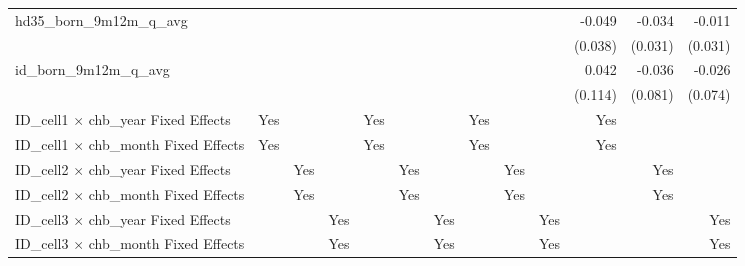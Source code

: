 \begin{tabular}{lrrrrrrrrrrrr}
hd35\_born\_9m12m\_q\_avg                   &              &              &              &              &              &              &              &              &              &       -0.049 &       -0.034 &       -0.011 \\ 
                                            &              &              &              &              &              &              &              &              &              &      (0.038) &      (0.031) &      (0.031) \\ 
id\_born\_9m12m\_q\_avg                     &              &              &              &              &              &              &              &              &              &        0.042 &       -0.036 &       -0.026 \\ 
                                            &              &              &              &              &              &              &              &              &              &      (0.114) &      (0.081) &      (0.074) \\ 
\midrule
ID\_cell1 $\times$ chb\_year Fixed Effects  &          Yes &              &              &          Yes &              &              &          Yes &              &              &          Yes &              &              \\ 
ID\_cell1 $\times$ chb\_month Fixed Effects &          Yes &              &              &          Yes &              &              &          Yes &              &              &          Yes &              &              \\ 
ID\_cell2 $\times$ chb\_year Fixed Effects  &              &          Yes &              &              &          Yes &              &              &          Yes &              &              &          Yes &              \\ 
ID\_cell2 $\times$ chb\_month Fixed Effects &              &          Yes &              &              &          Yes &              &              &          Yes &              &              &          Yes &              \\ 
ID\_cell3 $\times$ chb\_year Fixed Effects  &              &              &          Yes &              &              &          Yes &              &              &          Yes &              &              &          Yes \\ 
ID\_cell3 $\times$ chb\_month Fixed Effects &              &              &          Yes &              &              &          Yes &              &              &          Yes &              &              &          Yes \\ 

\end{tabular}
